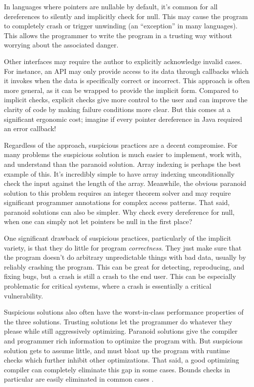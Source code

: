 In languages where pointers are nullable by default, it's common for all dereferences
to silently and implicitly check for null. This may cause the program to completely
crash or trigger unwinding (an ``exception'' in many languages). This allows the programmer
to write the program in a trusting way without worrying about the associated danger.

Other interfaces may require the author to explicitly acknowledge invalid cases.
For instance, an API may only provide access to its data through callbacks which it
invokes when the data is specifically correct or incorrect. This approach is often
more general, as it can be wrapped to provide the implicit form. Compared to
implicit checks, explicit checks give more control to the user and can improve the
clarity of code by making failure conditions more clear. But this comes at
a significant ergonomic cost; imagine if every pointer dereference in Java
required an error callback!

Regardless of the approach, suspicious practices are a decent compromise. For
many problems the suspicious solution is much easier to implement, work with,
and understand than the paranoid solution. Array indexing is perhaps the best
example of this. It's incredibly simple to have array indexing unconditionally
check the input against the length of the array. Meanwhile, the obvious paranoid
solution to this problem requires an integer theorem solver and may require
significant programmer annotations for complex access patterns. That said,
paranoid solutions can also be simpler. Why check every dereference for
null, when one can simply not let pointers be null in the first place?

One significant drawback of suspicious practices, particularly of the implicit
variety, is that they do little for program \emph{correctness}. They just make sure
that the program doesn't do arbitrary unpredictable things with bad data, usually by
reliably crashing the program. This can be great for detecting, reproducing,
and fixing bugs, but a crash is still a crash to the end user. This can be
especially problematic for critical systems, where a crash is essentially a
critical vulnerability.

Suspicious solutions also often have the worst-in-class performance properties
of the three solutions. Trusting solutions let the programmer do whatever they
please while still aggressively optimizing. Paranoid solutions give the
compiler and programmer rich information to optimize the program with.
But suspicious solution gets to assume little, and must bloat up
the program with runtime checks which further inhibit other optimizations.
That said, a good optimizing compiler can completely eliminate this gap in
some cases. Bounds checks in particular are easily eliminated in common cases
\cite{grosser2011polly}.




